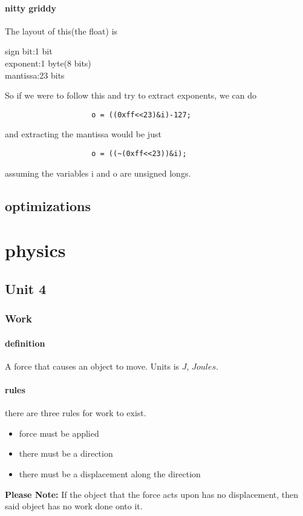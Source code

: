 \documentclass{article} %
\theoremstyle{theorem}
\theoremstyle{definition}
\begin{document}
            \paragraph{nitty griddy}
                The layout of this(the float) is 
                \begin{center}
                    sign bit:1 bit\\
                    exponent:1 byte(8 bits)\\
                    mantissa:23 bits\\
                \end{center}
                So if we were to follow this and try to extract exponents, we can do
                \begin{verbatim}
                    o = ((0xff<<23)&i)-127;
                \end{verbatim}
                and extracting the mantissa would be just 
                \begin{verbatim}
                    o = ((~(0xff<<23))&i);
                \end{verbatim}
                assuming the variables i and o are unsigned longs.
    \subsection{optimizations}
\section{physics}
    \subsection{Unit 4}
        \subsubsection{Work}
            \paragraph{definition}
                A force that causes an object to move. Units is $J$, $Joules$.
            \paragraph{rules}
                there are three rules for work to exist.
                \begin{itemize}
                    \item force must be applied
                    \item there must be a direction
                    \item there must be a displacement along the direction
                \end{itemize}
                \textbf{Please Note:} 
                If the object that the force acts upon has no displacement, then said object has no work done onto it.
\end{document}
